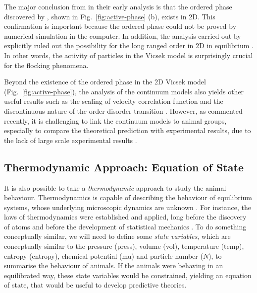 \documentclass[11pt,twoside]{report}
\begin{document}
The major conclusion from \citeauthor{toner1995} in their early analysis is that the ordered phase discovered by \citeauthor{vicsek1995}, shown in Fig.~\ref{fig:active-phase} (b), exists in 2D. This confirmation is important because the ordered phase could not be proved by numerical simulation in the computer.
In addition, the analysis carried out by \citeauthor{mermin1966} \cite{mermin1966} explicitly ruled out the possibility for the long ranged order in 2D in equilibrium \cite{sethna2006, ginelli2016}.
In other words, the activity of particles in the Vicsek model is surprisingly crucial for the flocking phenomena.

Beyond the existence of the ordered phase in the 2D Vicsek model (Fig.~\ref{fig:active-phase}), the analysis of the continuum models also yields other useful results such as the scaling of velocity correlation function and the discontinuous nature of the order-disorder transition \cite{solon2015, martin2021}. However, as \citeauthor{ouellette2022} commented recently, it is challenging to link the continuum models to animal groups, especially to compare the theoretical prediction with experimental results, due to the lack of large scale experimental results \cite{ouellette2022}.


\subsection{Thermodynamic Approach: Equation of State}

It is also possible to take a \emph{thermodynamic} approach to study the animal behaviour. Thermodynamics is capable of describing the behaviour of equilibrium systems, whose underlying microscopic dynamics are unknown \cite{ouellette2022}.
For instance, the laws of thermodynamics were established and applied, long before the discovery of atoms and before the development of statistical mechanics \cite{sethna2006, ouellette2022}.
To do something conceptually similar, we will need to define some \emph{state variables}, which are conceptually similar to the pressure (\gls{press}), volume (\gls{vol}), temperature (\gls{temp}), entropy (\gls{entropy}), chemical potential (\gls{mu}) and particle number ($N$), to summarise the behaviour of animals.
If the animals were behaving in an equilibrated way, these state variables would be constrained, yielding an equation of state, that would be useful to develop predictive theories.
\end{document}
